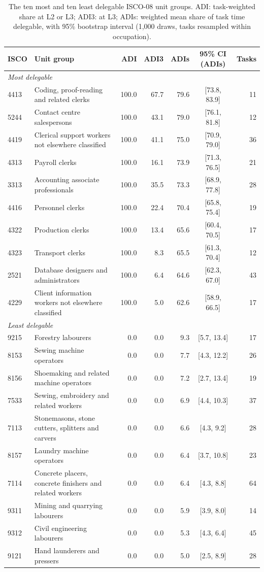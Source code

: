 \begin{table}[t]
\centering\footnotesize
\caption{The ten most and ten least delegable ISCO-08 unit groups. ADI: task-weighted share at L2 or L3; ADI3: at L3; ADIs: weighted mean share of task time delegable, with 95\% bootstrap interval (1,000 draws, tasks resampled within occupation).}
\label{tab:ocupaciones}
\begin{tabular}{lp{5.6cm}rrrcr}
\toprule
ISCO & Unit group & ADI & ADI3 & ADIs & 95\% CI (ADIs) & Tasks \\
\midrule
\multicolumn{7}{l}{\emph{Most delegable}}\\
4413 & Coding, proof-reading and related clerks & 100.0 & 67.7 & 79.6 & [73.8, 83.9] & 11 \\
5244 & Contact centre salespersons & 100.0 & 43.1 & 79.0 & [76.1, 81.8] & 12 \\
4419 & Clerical support workers not elsewhere classified & 100.0 & 41.1 & 75.0 & [70.9, 79.0] & 36 \\
4313 & Payroll clerks & 100.0 & 16.1 & 73.9 & [71.3, 76.5] & 21 \\
3313 & Accounting associate professionals & 100.0 & 35.5 & 73.3 & [68.9, 77.8] & 28 \\
4416 & Personnel clerks & 100.0 & 22.4 & 70.4 & [65.8, 75.4] & 19 \\
4322 & Production clerks & 100.0 & 13.4 & 65.6 & [60.4, 70.5] & 17 \\
4323 & Transport clerks & 100.0 & 8.3 & 65.5 & [61.3, 70.4] & 12 \\
2521 & Database designers and administrators & 100.0 & 6.4 & 64.6 & [62.3, 67.0] & 43 \\
4229 & Client information workers not elsewhere classified & 100.0 & 5.0 & 62.6 & [58.9, 66.5] & 17 \\
\midrule
\multicolumn{7}{l}{\emph{Least delegable}}\\
9215 & Forestry labourers & 0.0 & 0.0 & 9.3 & [5.7, 13.4] & 17 \\
8153 & Sewing machine operators & 0.0 & 0.0 & 7.7 & [4.3, 12.2] & 26 \\
8156 & Shoemaking and related machine operators & 0.0 & 0.0 & 7.2 & [2.7, 13.4] & 19 \\
7533 & Sewing, embroidery and related workers & 0.0 & 0.0 & 6.9 & [4.4, 10.3] & 37 \\
7113 & Stonemasons, stone cutters, splitters and carvers & 0.0 & 0.0 & 6.6 & [4.3, 9.2] & 28 \\
8157 & Laundry machine operators & 0.0 & 0.0 & 6.4 & [3.7, 10.8] & 23 \\
7114 & Concrete placers, concrete finishers and related workers & 0.0 & 0.0 & 6.4 & [4.3, 8.8] & 64 \\
9311 & Mining and quarrying labourers & 0.0 & 0.0 & 5.9 & [3.9, 8.0] & 14 \\
9312 & Civil engineering labourers & 0.0 & 0.0 & 5.3 & [4.3, 6.4] & 45 \\
9121 & Hand launderers and pressers & 0.0 & 0.0 & 5.0 & [2.5, 8.9] & 28 \\
\bottomrule
\end{tabular}
\end{table}

